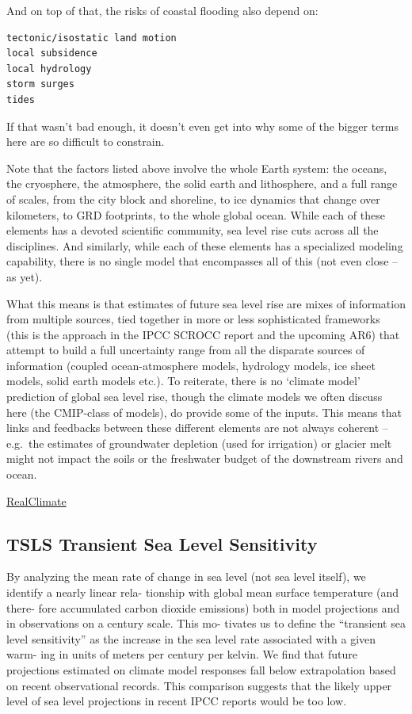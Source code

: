 \documentclass[
]{book}
\begin{document}
And on top of that, the risks of coastal flooding also depend on:

\begin{verbatim}
tectonic/isostatic land motion
local subsidence
local hydrology
storm surges
tides
\end{verbatim}

If that wasn't bad enough, it doesn't even get into why some of the bigger terms here are so difficult to constrain.

Note that the factors listed above involve the whole Earth system: the oceans, the cryosphere, the atmosphere, the solid earth and lithosphere, and a full range of scales, from the city block and shoreline, to ice dynamics that change over kilometers, to GRD footprints, to the whole global ocean. While each of these elements has a devoted scientific community, sea level rise cuts across all the disciplines. And similarly, while each of these elements has a specialized modeling capability, there is no single model that encompasses all of this (not even close -- as yet).

What this means is that estimates of future sea level rise are mixes of information from multiple sources, tied together in more or less sophisticated frameworks (this is the approach in the IPCC SCROCC report and the upcoming AR6) that attempt to build a full uncertainty range from all the disparate sources of information (coupled ocean-atmosphere models, hydrology models, ice sheet models, solid earth models etc.). To reiterate, there is no `climate model' prediction of global sea level rise, though the climate models we often discuss here (the CMIP-class of models), do provide some of the inputs. This means that links and feedbacks between these different elements are not always coherent -- e.g.~the estimates of groundwater depletion (used for irrigation) or glacier melt might not impact the soils or the freshwater budget of the downstream rivers and ocean.

\href{https://www.realclimate.org/index.php/archives/2021/05/why-is-future-sea-level-rise-still-so-uncertain/\#.YKyaa3u_nmc.twitter}{RealClimate}

\hypertarget{tsls-transient-sea-level-sensitivity}{%
\subsection{TSLS Transient Sea Level Sensitivity}\label{tsls-transient-sea-level-sensitivity}}

By analyzing the mean rate of change in sea
level (not sea level itself), we identify a nearly linear rela-
tionship with global mean surface temperature (and there-
fore accumulated carbon dioxide emissions) both in model
projections and in observations on a century scale. This mo-
tivates us to define the ``transient sea level sensitivity'' as the
increase in the sea level rate associated with a given warm-
ing in units of meters per century per kelvin. We find that
future projections estimated on climate model responses fall
below extrapolation based on recent observational records.
This comparison suggests that the likely upper level of sea
level projections in recent IPCC reports would be too low.
\end{document}
